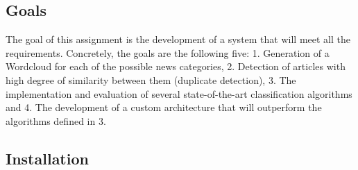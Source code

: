 \subsection{Goals}
The goal of this assignment is the development of a system that will meet all the requirements. Concretely, the goals are the following five: 1. Generation of a Wordcloud for each of the possible news categories, 2. Detection of articles with high degree of similarity between them (duplicate detection), 3. The implementation and evaluation of several state-of-the-art classification algorithms and 4. The development of a custom architecture that will outperform the algorithms defined in 3.
\subsection{Installation}